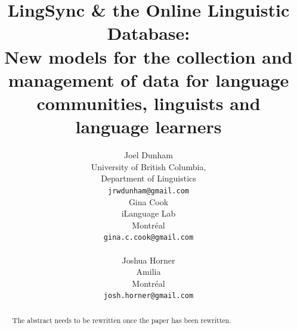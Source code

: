 \documentclass[11pt]{article}
\title{LingSync \& the Online Linguistic Database:\\New models for the
    collection and management of data for language communities, linguists and
language learners}
\author{Joel Dunham \\
University of British Columbia,   \\
Department of Linguistics \\
{\tt jrwdunham@gmail.com} \\\And
Gina Cook \\
iLanguage Lab \\
Montr\'eal \\
{\tt gina.c.cook@gmail.com} \\  \\\And
Joshua Horner \\
Amilia  \\
Montr\'eal \\
{\tt josh.horner@gmail.com} \\ }
\date{}
\begin{document}
\maketitle
\tableofcontents

\begin{abstract}
The abstract needs to be rewritten once the paper has been rewritten.
\end{abstract}

\end{document}
